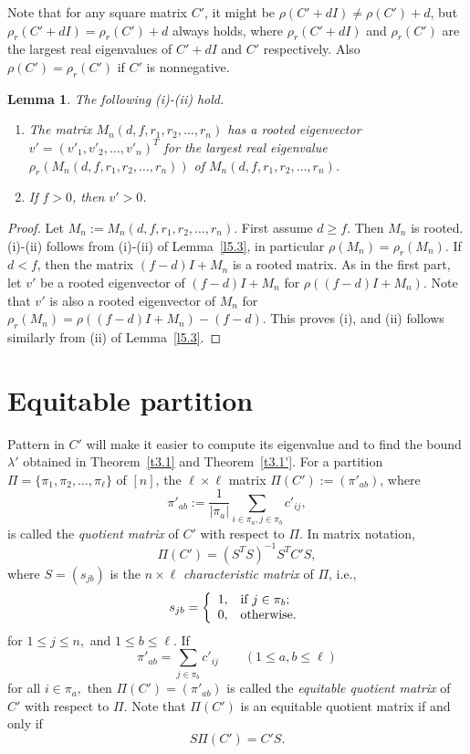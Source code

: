\documentclass[final,3p, times, 12pt]{elsarticle}
\theoremstyle{plain}
\newtheorem{lem}[thm]{Lemma}
\theoremstyle{definition}
\theoremstyle{remark}
\numberwithin{equation}{section}
\begin{document}
Note that for any square matrix $C'$, it might be $\rho(C'+dI)\not=\rho(C')+d$, but $\rho_r(C'+dI)=\rho_r(C')+d$ always holds, where $\rho_r(C'+dI)$ and $\rho_r(C')$ are the largest real eigenvalues of $C'+dI$ and $C'$ respectively.
Also $\rho(C')=\rho_r(C')$ if $C'$ is nonnegative.

\begin{lem}\label{l4.4} The following (i)-(ii) hold.
\begin{enumerate}
\item[(i)] The matrix $M_n(d, f, r_1, r_2, \ldots, r_n)$ has a rooted eigenvector $v'=(v'_1, v'_2, \ldots, v'_n)^T$ for the largest real eigenvalue $\rho_r(M_n(d, f, r_1, r_2, \ldots, r_n))$ of $M_n(d, f, r_1, r_2, \ldots, r_n)$.
\item[(ii)] If $f>0$, then $v'>0$.
\end{enumerate}
\end{lem}
\begin{proof} Let $M_n:=M_n(d, f, r_1, r_2, \ldots, r_n)$.
First assume $d\geq f$. Then $M_n$ is rooted. (i)-(ii) follows from (i)-(ii) of Lemma~\ref{l5.3},  in particular $\rho(M_n)=\rho_r(M_n)$.
If  $d<f$, then  the matrix $(f-d)I+M_n$  is a rooted matrix.
As in the first part, let $v'$ be a rooted eigenvector of $(f-d)I+M_n$ for $\rho((f-d)I+M_n).$ Note that $v'$ is also a rooted eigenvector of $M_n$ for $\rho_r(M_n)=\rho((f-d)I+M_n)-(f-d).$ This proves (i), and (ii) follows similarly  from (ii) of Lemma~\ref{l5.3}.
\end{proof}


\section{Equitable partition}\label{s3}

Pattern in $C'$ will make it easier to compute its eigenvalue and to find the bound $\lambda'$ obtained in Theorem~\ref{t3.1} and Theorem~\ref{t3.1'}.
For a partition $\Pi=\{\pi_1, \pi_2, \ldots, \pi_\ell\}$ of $[n]$,
 the $\ell\times \ell$ matrix $\Pi(C'):=(\pi'_{ab})$, where
$$\pi'_{ab}:= \frac{1}{|\pi_a|}\sum_{i\in \pi_a, j\in \pi_b} c'_{ij},$$
is called the {\it quotient matrix} of $C'$ with respect to $\Pi$. In matrix notation,
\begin{equation}\label{e5.1}
\Pi(C')=(S^TS)^{-1}S^TC'S,
\end{equation}
where $S=(s_{jb})$ is the $n\times \ell$ {\it characteristic matrix} of $\Pi$, i.e.,
$$s_{jb}=
\left\{
\begin{array}{ll}
1, & \hbox{if $j\in \pi_b$;} \\
0, & \hbox{otherwise.} \\
\end{array}
\right.$$
for $1\leq j\leq n,$ and $1\leq b\leq \ell.$
If
$$\pi'_{ab}=\sum_{j\in \pi_b} c'_{ij}\qquad (1\leq a, b\leq \ell)$$
for all $i\in \pi_a,$ then  $\Pi(C')=(\pi'_{ab})$ is called
the {\it equitable quotient matrix} of $C'$ with respect to $\Pi.$
Note that $\Pi(C')$ is an equitable quotient matrix if and only if  \begin{equation}\label{e5.2}S\Pi(C')=C'S.\end{equation}
\end{document}
